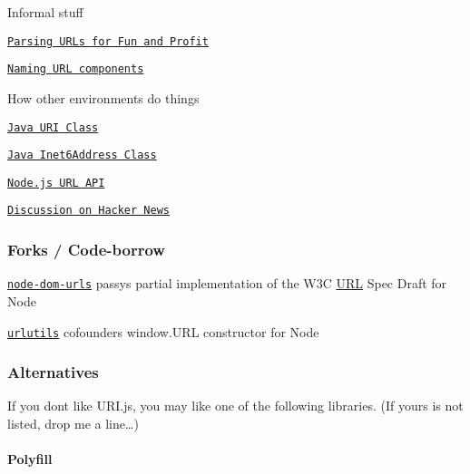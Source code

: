 Informal stuff


\begin{DoxyItemize}
\item \href{http://tools.ietf.org/html/draft-abarth-url-01}{\tt Parsing U\+R\+Ls for Fun and Profit}
\item \href{http://tantek.com/2011/238/b1/many-ways-slice-url-name-pieces}{\tt Naming U\+RL components}
\end{DoxyItemize}

How other environments do things


\begin{DoxyItemize}
\item \href{http://docs.oracle.com/javase/7/docs/api/java/net/URI.html}{\tt Java U\+RI Class}
\item \href{http://docs.oracle.com/javase/1.5.0/docs/api/java/net/Inet6Address.html}{\tt Java Inet6\+Address Class}
\item \href{http://nodejs.org/docs/latest/api/url.html}{\tt Node.\+js U\+RL A\+PI}
\end{DoxyItemize}

\href{https://news.ycombinator.com/item?id=3398837}{\tt Discussion on Hacker News}

\subsubsection*{Forks / Code-\/borrow}


\begin{DoxyItemize}
\item \href{https://github.com/passy/node-dom-urls}{\tt node-\/dom-\/urls} passy\textquotesingle{}s partial implementation of the W3C \mbox{\hyperlink{namespace_u_r_l}{U\+RL}} Spec Draft for Node
\item \href{https://github.com/cofounders/urlutils}{\tt urlutils} cofounders\textquotesingle{} {\ttfamily window.\+U\+RL} constructor for Node
\end{DoxyItemize}

\subsubsection*{Alternatives}

If you don\textquotesingle{}t like U\+R\+I.\+js, you may like one of the following libraries. (If yours is not listed, drop me a line…)

\paragraph*{Polyfill}


